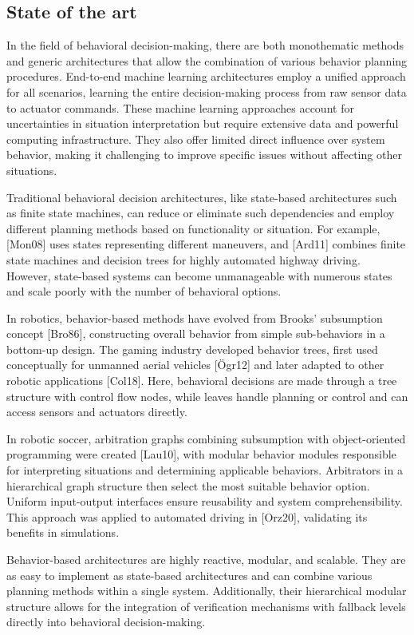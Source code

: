 \subsection{State of the art}
In the field of behavioral decision-making, there are both monothematic methods and generic architectures that allow the combination of various behavior planning procedures.
End-to-end machine learning architectures employ a unified approach for all scenarios, learning the entire decision-making process from raw sensor data to actuator commands.
These machine learning approaches account for uncertainties in situation interpretation but require extensive data and powerful computing infrastructure.
They also offer limited direct influence over system behavior, making it challenging to improve specific issues without affecting other situations.

Traditional behavioral decision architectures, like state-based architectures such as finite state machines, can reduce or eliminate such dependencies and employ different planning methods based on functionality or situation.
For example, [Mon08] uses states representing different maneuvers, and [Ard11] combines finite state machines and decision trees for highly automated highway driving.
However, state-based systems can become unmanageable with numerous states and scale poorly with the number of behavioral options.

In robotics, behavior-based methods have evolved from Brooks' subsumption concept [Bro86], constructing overall behavior from simple sub-behaviors in a bottom-up design.
The gaming industry developed behavior trees, first used conceptually for unmanned aerial vehicles [Ögr12] and later adapted to other robotic applications [Col18].
Here, behavioral decisions are made through a tree structure with control flow nodes, while leaves handle planning or control and can access sensors and actuators directly.

In robotic soccer, arbitration graphs combining subsumption with object-oriented programming were created [Lau10], with modular behavior modules responsible for interpreting situations and determining applicable behaviors.
Arbitrators in a hierarchical graph structure then select the most suitable behavior option.
Uniform input-output interfaces ensure reusability and system comprehensibility.
This approach was applied to automated driving in [Orz20], validating its benefits in simulations.

Behavior-based architectures are highly reactive, modular, and scalable.
They are as easy to implement as state-based architectures and can combine various planning methods within a single system.
Additionally, their hierarchical modular structure allows for the integration of verification mechanisms with fallback levels directly into behavioral decision-making.

